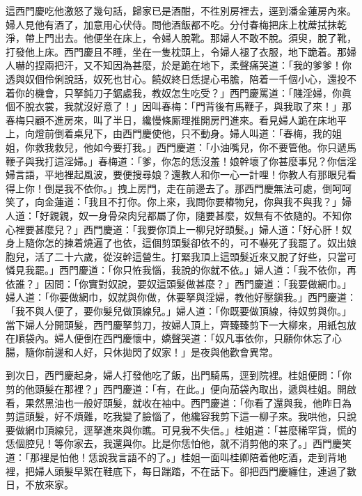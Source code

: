 這西門慶吃他激怒了幾句話，歸家已是酒酣，不徃別房裡去，逕到潘金蓮房內來。婦人見他有酒了，加意用心伏侍。問他酒飯都不吃。分付春梅把床上枕蓆拭抹乾淨，帶上門出去。他便坐在床上，令婦人脫靴。那婦人不敢不脫。須臾，脫了靴，打發他上床。西門慶且不睡，坐在一隻枕頭上，令婦人褪了衣服，地下跪着。{}那婦人嚇的捏兩把汗，又不知因為甚麼，於是跪在地下，柔聲痛哭道：「我的爹爹！你透與奴個伶俐說話，奴死也甘心。饒奴終日恁提心弔膽，陪着一千個小心，還投不着你的機會，只拏鈍刀子鋸處我，教奴怎生吃受？」西門慶罵道：「賤淫婦，你眞個不脫衣裳，我就沒好意了！」因叫春梅：「門背後有馬鞭子，與我取了來！」{}那春梅只顧不進房來，叫了半日，纔慢條厮理{}推開房門進來。看見婦人跪在床地平上，向燈前倒着桌兒下，由西門慶使他，只不動身。婦人叫道：「春梅，我的姐姐，你救我救兒，他如今要打我。」西門慶道：「小油嘴兒，你不要管他。你只遞馬鞭子與我打這淫婦。」{}春梅道：「爹，你怎的恁沒羞！娘幹壞了你甚麼事兒？你信淫婦言語，平地裡起風波，要便搜尋娘？還教人和你一心一計哩！你教人有那眼兒看得上你！倒是我不依你。」拽上房門，走在前邊去了。那西門慶無法可處，倒呵呵笑了，{}向金蓮道：「我且不打你。你上來，我問你要樁物兒，你與我不與我？」{}婦人道：「好親親，奴一身骨朶肉兒都屬了你，{}隨要甚麼，奴無有不依隨的。不知你心裡要甚麼兒？」西門慶道：「我要你頂上一柳兒好頭髮。」婦人道：「好心肝！奴身上隨你怎的揀着燒遍了也依，這個剪頭髮卻依不的，可不嚇死了我罷了。奴出娘胞兒，活了二十六歲，從沒幹這營生。打緊我頂上這頭髮近來又脫了好些，{}只當可憐見我罷。」西門慶道：「你只恠我惱，我說的你就不依。」婦人道：「我不依你，再依誰？」因問：「你實對奴說，要奴這頭髮做甚麼？」西門慶道：「我要做網巾。」婦人道：「你要做網巾，奴就與你做，休要拏與淫婦，教他好壓鎭我。」西門慶道：「我不與人便了，要你髮兒做頂線兒。」婦人道：「你既要做頂線，待奴剪與你。」當下婦人分開頭髮，西門慶拏剪刀，按婦人頂上，齊臻臻剪下一大柳來，用紙包放在順袋內。{}婦人便倒在西門慶懷中，嬌聲哭道：「奴凡事依你，只願你休忘了心腸，隨你前邊和人好，只休拋閃了奴家！」是夜與他歡會異常。

到次日，西門慶起身，婦人打發他吃了飯，出門騎馬，逕到院裡。桂姐便問：「你剪的他頭髮在那裡？」西門慶道：「有，在此。」便向茄袋內取出，遞與桂姐。開啟看，果然黑油也一般好頭髮，{}就收在袖中。西門慶道：「你看了還與我，他昨日為剪這頭髮，好不煩難，吃我變了臉惱了，他纔容我剪下這一柳子來。我哄他，只說要做網巾頂線兒，逕拏進來與你瞧。可見我不失信。」桂姐道：「甚麼稀罕貨，慌的恁個腔兒！等你家去，我還與你。比是你恁怕他，就不消剪他的來了。」{}西門慶笑道：「那裡是怕他！恁說我言語不的了。」桂姐一面叫桂卿陪着他吃酒，走到背地裡，把婦人頭髮早絮在鞋底下，每日踹踏，{}不在話下。卻把西門慶纏住，連過了數日，不放來家。

